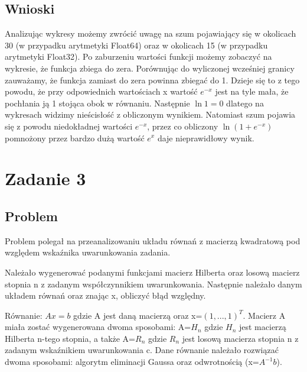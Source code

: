 \documentclass[11pt, a4paper]{article}
\begin{document}
\subsection{Wnioski}
Analizując wykresy możemy zwrócić uwagę na szum pojawiający się w okolicach 30 (w przypadku arytmetyki Float64) oraz w okolicach 15 (w przypadku arytmetyki Float32). Po zaburzeniu wartości funkcji możemy zobaczyć na wykresie, że funkcja zbiega do zera. Porównując do wyliczonej wcześniej granicy zauważamy, że funkcja zamiast do zera powinna zbiegać do 1. Dzieje się to z tego powodu, że przy odpowiednich wartościach x wartość $e^{-x}$ jest na tyle mała, że pochłania ją 1 stojąca obok w równaniu. Następnie $\ln 1 = 0$ dlatego na wykresach widzimy nieścisłość z obliczonym wynikiem. Natomiast szum pojawia się z powodu niedokładnej wartości $e^{-x}$, przez co obliczony $\ln{(1 + e^{-x})}$ pomnożony przez bardzo dużą wartość $e^x$ daje nieprawidłowy wynik.



\section{Zadanie 3}
\subsection{Problem}
Problem polegał na przeanalizowaniu układu równań z macierzą kwadratową pod względem wskaźnika uwarunkowania zadania.

Należało wygenerować podanymi funkcjami macierz Hilberta oraz losową macierz stopnia n z zadanym współczynnikiem uwarunkowania. Następnie należało danym układem równań oraz znając x, obliczyć błąd względny.

Równanie: $Ax = b$ gdzie A jest daną macierzą oraz x=$(1,...,1)^{T}$. Macierz A miała zostać wygenerowana dwoma sposobami: A=$H_{n}$ gdzie $H_{n}$ jest macierzą Hilberta n-tego stopnia, a także A=$R_{n}$ gdzie $R_{n}$ jest losową macierza stopnia n z zadanym wskaźnikiem uwarunkowania c. Dane równanie należało rozwiązać dwoma sposobami: algorytm eliminacji Gaussa oraz odwrotnością (x=$A^{-1}b$).
\end{document}
